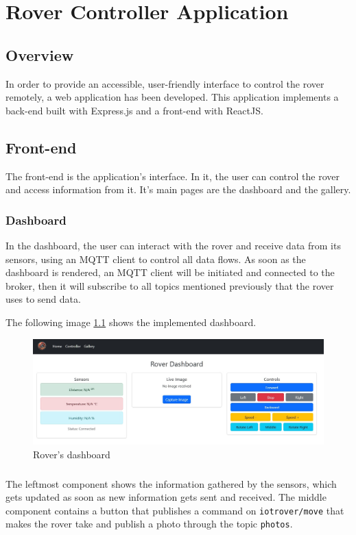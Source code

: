 \chapter{Rover Controller Application}

\section{Overview} 
In order to provide an accessible, user-friendly interface to control the rover remotely, a web application has been developed. This application implements a back-end built with Express.js and a front-end with ReactJS.

\section{Front-end}
The front-end is the application's interface. In it, the user can control the rover and access information from it. It's main pages are the dashboard and the gallery.
\subsection{Dashboard}
In the dashboard, the user can interact with the rover and receive data from its sensors, using an MQTT client to control all data flows.
As soon as the dashboard is rendered, an MQTT client will be initiated and connected to the broker, then it will subscribe to all topics mentioned previously that the rover uses to send data.

The following image \ref{fig:web_dash} shows the implemented dashboard.
\begin{figure}[h]
    \centering
    \includegraphics[width=1\linewidth]{Hauptkapitel/Pictures/App_dashboard.jpg}
    \caption{Rover's dashboard}
    \label{fig:web_dash}
\end{figure}
\paragraph{}The leftmost component shows the information gathered by the sensors, which gets updated as soon as new information gets sent and received. The middle component contains a button that publishes a command on \lstinline|iotrover/move| that makes the rover take and publish a photo through the topic \lstinline|photos|. 

